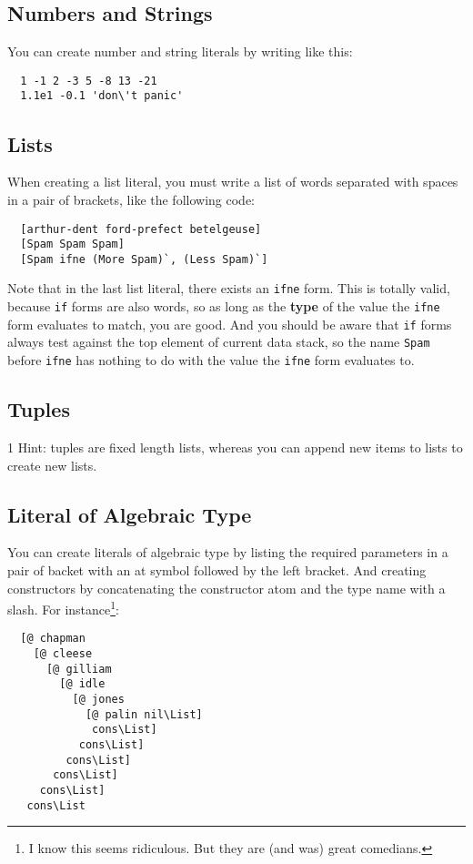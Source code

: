 \documentclass{book}
\begin{document}
\subsection{Numbers and Strings}

You can create number and string literals by writing like this:
\begin{verbatim}
  1 -1 2 -3 5 -8 13 -21
  1.1e1 -0.1 'don\'t panic'
\end{verbatim}

\subsection{Lists}

When creating a list literal, you must write a list of words separated with spaces in a pair of brackets, like the following code:
\begin{verbatim}
  [arthur-dent ford-prefect betelgeuse]
  [Spam Spam Spam]
  [Spam ifne (More Spam)`, (Less Spam)`]
\end{verbatim}

Note that in the last list literal, there exists an \texttt{ifne} form. This
is totally valid, because \texttt{if} forms are also words, so as long as the \textbf{type} of the value the \texttt{ifne} form evaluates to match, you are good. And you should be aware that \texttt{if} forms always test against the top element of current data stack, so the name \texttt{Spam} before \texttt{ifne} has nothing to do with the value the \texttt{ifne} form evaluates to.

\subsection{Tuples}

1 Hint: tuples are fixed length lists, whereas you can append new items to lists to create new lists.

\subsection{Literal of Algebraic Type}

You can create literals of algebraic type by listing the required parameters in a pair of backet with an at symbol followed by the left bracket. And creating constructors by concatenating the constructor atom and the type name with a slash. For instance\footnote{I know this seems ridiculous. But they are (and was) great comedians.}:
\begin{verbatim}
  [@ chapman
    [@ cleese
      [@ gilliam
        [@ idle
          [@ jones
            [@ palin nil\List]
             cons\List]
           cons\List]
         cons\List]
       cons\List]
     cons\List]
   cons\List
\end{verbatim}
\end{document}
